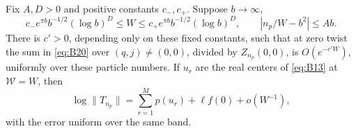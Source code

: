 \begin{lemma}
\label{lem:bethe-transfer-uniform}
Fix $A,D>0$ and positive constants $c_-,c_+$.  Suppose $b\to\infty$,
\[
 c_-e^{\pi b}b^{-1/2}(\log b)^D
 \le W\le c_+e^{\pi b}b^{-1/2}(\log b)^D,
 \qquad |n_p/W-b^2|\le Ab.
\]
There is $c'>0$, depending only on these fixed constants, such that at
zero twist the sum in \eqref{eq:B20} over $(q,j)\ne(0,0)$, divided by
$Z_{n_p}(0,0)$, is $O(e^{-c'W})$, uniformly over these particle numbers.
If $u_r$ are the real centers of \eqref{eq:B13} at $\mathcal W=W$, then
\begin{equation}
 \log\|T_{n_p}\|
   =\sum_{r=1}^M p(u_r)+\ell f(0)+o(W^{-1}),
 \label{eq:B21}
\end{equation}
with the error uniform over the same band.
\end{lemma}

